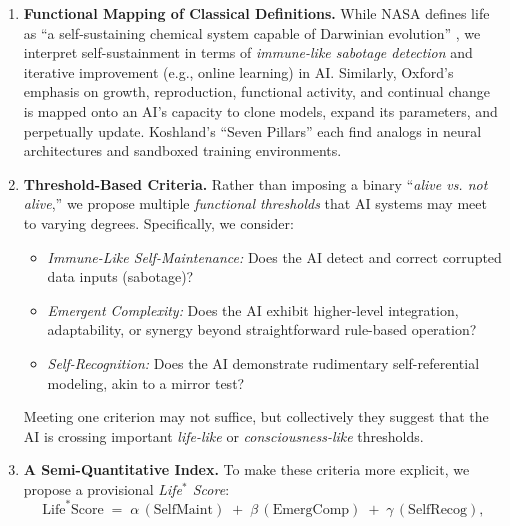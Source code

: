 \documentclass[12pt]{article}
\begin{document}
\begin{enumerate}
    \item \textbf{Functional Mapping of Classical Definitions.} While NASA defines
          life as ``a self-sustaining chemical system capable of Darwinian evolution''
          \cite{Joyce1994}, we interpret self-sustainment in terms of \emph{immune-like sabotage detection}
          and iterative improvement (e.g., online learning) in AI. Similarly, Oxford’s
          emphasis on growth, reproduction, functional activity, and continual change
          \cite{Kasting1997} is mapped onto an AI’s capacity to clone models, expand its parameters,
          and perpetually update. Koshland’s ``Seven Pillars'' \cite{Koshland2002} each find
          analogs in neural architectures and sandboxed training environments.
    
    \item \textbf{Threshold-Based Criteria.} Rather than imposing a binary
          “\emph{alive vs. not alive},” we propose multiple \emph{functional thresholds}
          that AI systems may meet to varying degrees. Specifically, we consider:
          \begin{itemize}
              \item \emph{Immune-Like Self-Maintenance:} Does the AI detect and correct
                    corrupted data inputs (sabotage)? 
              \item \emph{Emergent Complexity:} Does the AI exhibit higher-level
                    integration, adaptability, or synergy beyond straightforward
                    rule-based operation?
              \item \emph{Self-Recognition:} Does the AI demonstrate rudimentary
                    self-referential modeling, akin to a mirror test?
          \end{itemize}
          Meeting one criterion may not suffice, but collectively they suggest that the AI
          is crossing important \emph{life-like} or \emph{consciousness-like} thresholds.
    
    \item \textbf{A Semi-Quantitative Index.} To make these criteria more explicit, we
          propose a provisional \emph{Life\texorpdfstring{$^*$}{\^{}*} Score}:
\begin{equation}
    \text{Life}^{*}\text{Score} \;=\;
    \alpha\,(\mathrm{SelfMaint}) \;+\; \beta\,(\mathrm{EmergComp}) \;+\; \gamma\,(\mathrm{SelfRecog}),
    \label{eq:life_star_score}
\end{equation}


\end{enumerate}
\end{document}
